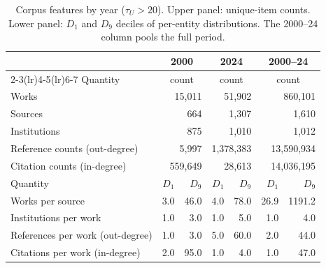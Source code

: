 \begin{table}[htbp]
\centering
\caption{Corpus features by year ($\tau_U > 20$). Upper panel: unique-item counts. Lower panel: $D_1$ and $D_9$ deciles of per-entity distributions. The 2000--24 column pools the full period.}
\label{tab:corpus_features}
\begin{tabular}{lrrrrrr}
\toprule
 & \multicolumn{2}{c}{2000} & \multicolumn{2}{c}{2024} & \multicolumn{2}{c}{2000--24} \\
\cmidrule(lr){2-3}\cmidrule(lr){4-5}\cmidrule(lr){6-7}
Quantity & \multicolumn{2}{c}{count} & \multicolumn{2}{c}{count} & \multicolumn{2}{c}{count} \\
\midrule
Works & \multicolumn{2}{r}{15,011} & \multicolumn{2}{r}{51,902} & \multicolumn{2}{r}{860,101} \\
Sources & \multicolumn{2}{r}{664} & \multicolumn{2}{r}{1,307} & \multicolumn{2}{r}{1,610} \\
Institutions & \multicolumn{2}{r}{875} & \multicolumn{2}{r}{1,010} & \multicolumn{2}{r}{1,012} \\
Reference counts (out-degree) & \multicolumn{2}{r}{5,997} & \multicolumn{2}{r}{1,378,383} & \multicolumn{2}{r}{13,590,934} \\
Citation counts (in-degree) & \multicolumn{2}{r}{559,649} & \multicolumn{2}{r}{28,613} & \multicolumn{2}{r}{14,036,195} \\
\midrule
Quantity & $D_1$ & $D_9$ & $D_1$ & $D_9$ & $D_1$ & $D_9$ \\
\midrule
Works per source & 3.0 & 46.0 & 4.0 & 78.0 & 26.9 & 1191.2 \\
Institutions per work & 1.0 & 3.0 & 1.0 & 5.0 & 1.0 & 4.0 \\
References per work (out-degree) & 1.0 & 3.0 & 5.0 & 60.0 & 2.0 & 44.0 \\
Citations per work (in-degree) & 2.0 & 95.0 & 1.0 & 4.0 & 1.0 & 47.0 \\
\bottomrule
\end{tabular}
\end{table}
